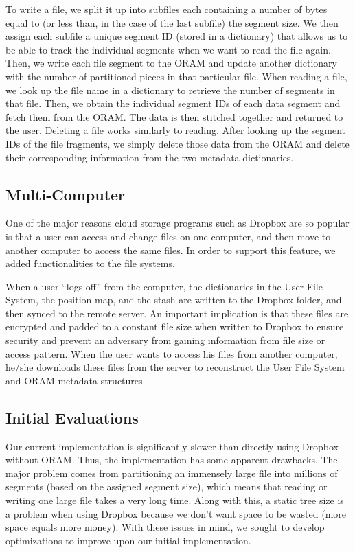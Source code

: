 \documentclass[conference]{IEEEtran}
\begin{document}
To write a file, we split it up into subfiles each containing a number of bytes equal to (or less than, in the case of the last subfile) the segment size. We then assign each subfile a unique segment ID (stored in a dictionary) that allows us to be able to track the individual segments when we want to read the file again. Then, we write each file segment to the ORAM and update another dictionary with the number of partitioned pieces in that particular file. When reading a file, we look up the file name in a dictionary to retrieve the number of segments in that file. Then, we obtain the individual segment IDs of each data segment and fetch them from the ORAM. The data is then stitched together and returned to the user. Deleting a file works similarly to reading. After looking up the segment IDs of the file fragments, we simply delete those data from the ORAM and delete their corresponding information from the two metadata dictionaries.

\subsection{Multi-Computer}

One of the major reasons cloud storage programs such as Dropbox are so popular is that a user can access and change files on one computer, and then move to another computer to access the same files. In order to support this feature, we added functionalities to the file systems.

When a user “logs off” from the computer, the dictionaries in the User File System, the position map, and the stash are written to the Dropbox folder, and then synced to the remote server. An important implication is that these files are encrypted and padded to a constant file size when written to Dropbox to ensure security and prevent an adversary from gaining information from file size or access pattern. When the user wants to access his files from another computer, he/she downloads these files from the server to reconstruct the User File System and ORAM metadata structures.

\subsection{Initial Evaluations}

Our current implementation is significantly slower than directly using Dropbox without ORAM. Thus, the implementation has some apparent drawbacks. The major problem comes from partitioning an immensely large file into millions of segments (based on the assigned segment size), which means that reading or writing one large file takes a very long time. Along with this, a static tree size is a problem when using Dropbox because we don’t want space to be wasted (more space equals more money). With these issues in mind, we sought to develop optimizations to improve upon our initial implementation.
\end{document}
